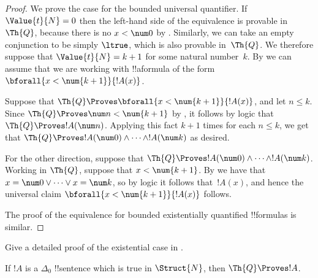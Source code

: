 \documentclass[../../../include/open-logic-section]{subfiles}
\begin{document}
\begin{proof}
    We prove the case for the bounded universal quantifier.
    If $\Value{t}{N} = 0$ then the left-hand side of the
    equivalence is provable in~$\Th{Q}$, because there is no
    $x<\num 0$ by .
    Similarly, we can take an empty conjunction to be simply
    $\ltrue$, which is also provable in~$\Th{Q}$.
    We therefore suppose that $\Value{t}{N} = k+1$ for some
    natural number~$k$. By  we
    can assume that we are working with !!a{formula} of the
    form $\bforall{x<\num{k+1}}{!A(x)}$.
    
    Suppose that $\Th{Q} \Proves \bforall{x<\num{k+1}}{!A(x)}$,
    and let $n \leq k$. Since $\Th{Q} \Proves \num n < \num{k+1}$
    by , it follows by logic that
    $\Th{Q} \Proves !A(\num n)$. Applying this fact $k+1$ times
    for each $n \leq k$, we get that $\Th{Q} \Proves !A(\num 0)
    \land \dots \land !A(\num k)$ as desired.
    
    For the other direction, suppose that $\Th{Q} \Proves
    !A(\num 0) \land \dots \land !A(\num k)$. Working in
    $\Th{Q}$, suppose that $x < \num{k+1}$.
    By  we have that
    $x = \num 0 \lor \dots \lor x = \num k$, so by logic it
    follows that~$!A(x)$, and hence the universal claim
    $\bforall{x<\num{k+1}}{!A(x)}$ follows.
    
    The proof of the equivalence for bounded existentially
    quantified !!{formula}s is similar.
\end{proof}

\begin{prob}
Give a detailed proof of the existential case in
.
\end{prob}

\begin{lem}
If $!A$ is a $\Delta_0$ !!{sentence} which is true in
$\Struct{N}$, then $\Th{Q} \Proves !A$.
\end{lem}
\end{document}
